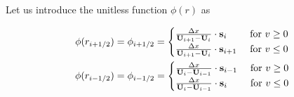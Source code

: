 %
%
%
%
%





Let us introduce the unitless function $\phi(r)$ as

\begin{align}
	\phi(r_{i+1/2}) &= \phi_{i+1/2} = 
		\begin{cases}
			\frac{\Delta x}{\mathbf{U}_{i+1} - \mathbf{U}_{i}} \cdot \mathbf{s}_{i} 	& 	\text{ for } v \geq 0 \\
			\frac{\Delta x}{\mathbf{U}_{i+1} - \mathbf{U}_{i}} \cdot \mathbf{s}_{i+1}	&	\text{ for } v \leq 0 \\
		\end{cases}
		\\
	\phi(r_{i-1/2}) &= \phi_{i-1/2} = 
		\begin{cases}
			\frac{\Delta x}{\mathbf{U}_i - \mathbf{U}_{i-1}} \cdot \mathbf{s}_{i-1} 	& 	\text{ for } v \geq 0 \\
			\frac{\Delta x}{\mathbf{U}_i - \mathbf{U}_{i-1}} \cdot \mathbf{s}_{i}	&	\text{ for } v \leq 0 \\
		\end{cases}
\end{align}


